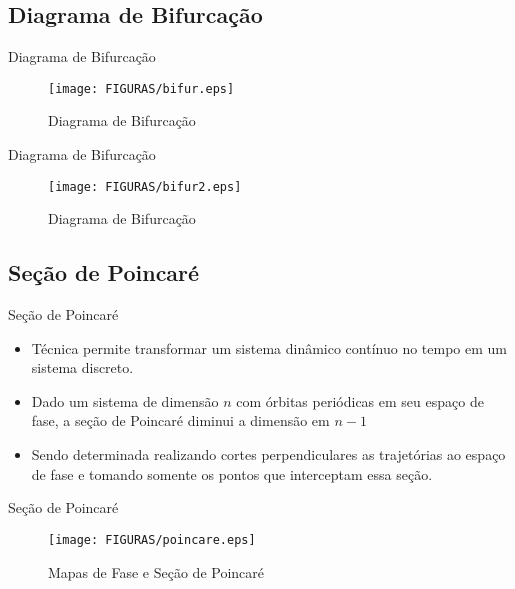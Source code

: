 \documentclass[12pt,aspectratio=169]{beamer}
\begin{document}
\subsection{Diagrama de Bifurcação}
\begin{frame}{Diagrama de Bifurcação}
\begin{figure}[h]
\centering
\texttt{[image: FIGURAS/bifur.eps]} 
\caption{Diagrama de Bifurcação}
\label{fig:01}
\end{figure}
\end{frame}

\begin{frame}{Diagrama de Bifurcação}
\begin{figure}[h]
\centering
\texttt{[image: FIGURAS/bifur2.eps]} 
\caption{Diagrama de Bifurcação}
\label{fig:02}
\end{figure}
\end{frame}

\subsection{Seção de Poincaré}
\begin{frame}{Seção de Poincaré}
\begin{itemize}
    \item Técnica permite transformar um sistema dinâmico contínuo no tempo em um sistema discreto.
    \item Dado um sistema de dimensão $n$ com órbitas periódicas em seu espaço de fase, a seção de Poincaré diminui a dimensão em $n-1$
    \item Sendo determinada realizando cortes perpendiculares as trajetórias ao espaço de fase e tomando somente os pontos que interceptam essa seção.
\end{itemize}
\end{frame}


\begin{frame}{Seção de Poincaré}
\begin{figure}[h]
\centering
\texttt{[image: FIGURAS/poincare.eps]} 
\caption{Mapas de Fase e Seção de Poincaré}
\label{fig:03}
\end{figure}
\end{frame}
\end{document}
